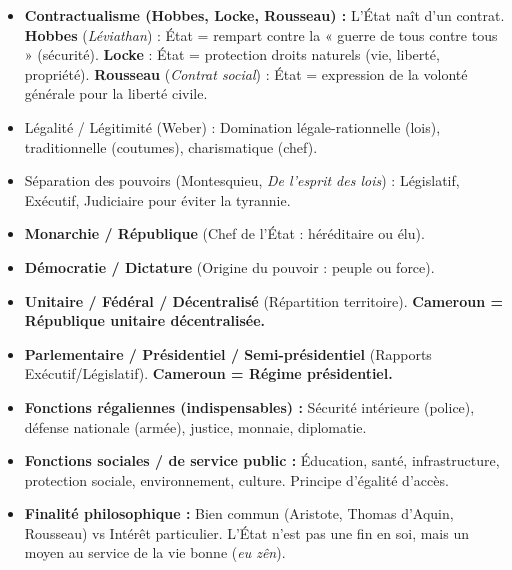 \documentclass[11pt]{article}
\newcommand{\cle}[1]{{\popxbold\color{popdark}#1}}
\begin{document}
\begin{definition}
\begin{itemize}
    \item \textbf{Contractualisme (Hobbes, Locke, Rousseau) :} L'État naît d'un contrat. \textbf{Hobbes} (\emph{Léviathan}) : État = rempart contre la « guerre de tous contre tous » (sécurité). \textbf{Locke} : État = protection droits naturels (vie, liberté, propriété). \textbf{Rousseau} (\emph{Contrat social}) : État = expression de la \cle{volonté générale} pour la liberté civile.
    \item \cle{Légalité / Légitimité (Weber) :} Domination légale-rationnelle (lois), traditionnelle (coutumes), charismatique (chef).
    \item \cle{Séparation des pouvoirs (Montesquieu, \emph{De l'esprit des lois}) :} Législatif, Exécutif, Judiciaire pour éviter la tyrannie.
\end{itemize}
\end{definition}

\begin{definition}
\begin{itemize}
    \item \textbf{Monarchie / République} (Chef de l'État : héréditaire ou élu).
    \item \textbf{Démocratie / Dictature} (Origine du pouvoir : peuple ou force).
    \item \textbf{Unitaire / Fédéral / Décentralisé} (Répartition territoire). \rightarrow \textbf{Cameroun = République unitaire décentralisée.}
    \item \textbf{Parlementaire / Présidentiel / Semi-présidentiel} (Rapports Exécutif/Législatif). \rightarrow \textbf{Cameroun = Régime présidentiel.}
\end{itemize}
\end{definition}

\begin{definition}
\begin{itemize}
    \item \textbf{Fonctions régaliennes (indispensables) :} Sécurité intérieure (police), défense nationale (armée), justice, monnaie, diplomatie.
    \item \textbf{Fonctions sociales / de service public :} Éducation, santé, infrastructure, protection sociale, environnement, culture. \cle{Principe d'égalité d'accès}.
    \item \textbf{Finalité philosophique :} \cle{Bien commun} (Aristote, Thomas d'Aquin, Rousseau) vs \cle{Intérêt particulier}. L'État n'est pas une fin en soi, mais un \cle{moyen} au service de la vie bonne (\emph{eu zên}).
\end{itemize}
\end{definition}
\end{document}
